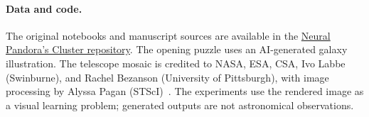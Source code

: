 \documentclass[10pt,twocolumn,letterpaper]{article}
\begin{document}
\paragraph{Data and code.}
The original notebooks and manuscript sources are available in the \href{https://github.com/magnux/neural_pandoras_cluster}{Neural Pandora's Cluster repository}. The opening puzzle uses an AI-generated galaxy illustration. The telescope mosaic is credited to NASA, ESA, CSA, Ivo Labbe (Swinburne), and Rachel Bezanson (University of Pittsburgh), with image processing by Alyssa Pagan (STScI)~\cite{webb}. The experiments use the rendered image as a visual learning problem; generated outputs are not astronomical observations.

{\small


}

\appendix



\end{document}
